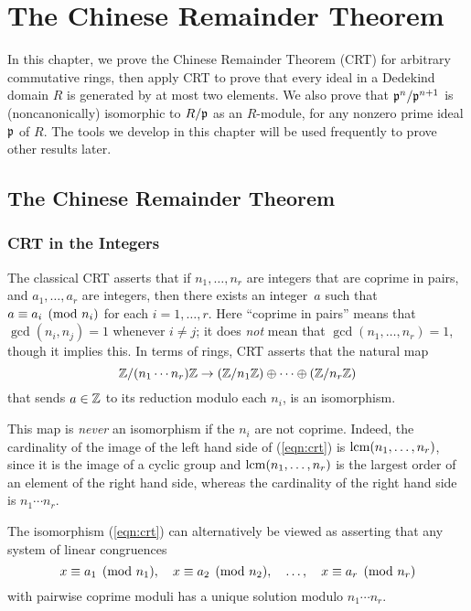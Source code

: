\chapter{The Chinese Remainder Theorem}\label{ch:crt}
In this chapter, we prove the Chinese Remainder Theorem (CRT) for
arbitrary commutative rings, then apply CRT to prove that every ideal
in a Dedekind domain $R$ is generated by at most two elements.  We
also prove that $\mathfrak{p}^n/\mathfrak{p}^{n+1}$ is (noncanonically) isomorphic to
$R/\mathfrak{p}$ as an $R$-module, for any nonzero prime ideal $\mathfrak{p}$ of $R$.  The
tools we develop in this chapter will be used frequently to prove
other results later.

\section{The Chinese Remainder Theorem}

\subsection{CRT in the Integers}
The classical CRT asserts that if $n_1,\ldots, n_r$ are integers that are coprime
in pairs, and $a_1,\ldots, a_r$ are integers, then there exists an
integer~$a$ such that $a\equiv a_i\pmod{n_i}$ for each $i=1,\ldots,r$.
Here ``coprime in pairs'' means that $\gcd(n_i,n_j)=1$ whenever
$i\neq j$; it does {\em not} mean that $\gcd(n_1,\ldots, n_r)=1$,
though it implies this. 
In terms of rings, CRT asserts that the
natural map
\begin{equation}\label{eqn:crt}
\mathbb{Z}/(n_1\cdots n_r)\mathbb{Z} \to (\mathbb{Z}/n_1\mathbb{Z})\oplus \cdots \oplus (\mathbb{Z}/n_r\mathbb{Z})
\end{equation}
that sends $a \in \mathbb{Z}$ to its reduction modulo each $n_i$,
is an isomorphism.  

This map is {\em never} an isomorphism if the $n_i$ are not coprime.
Indeed, the cardinality of the image of the left hand side of
(\ref{eqn:crt}) is $\operatorname{lcm}(n_1,\ldots, n_r)$, since it is the image of a
cyclic group and $\operatorname{lcm}(n_1,\ldots, n_r)$ is the largest order of an
element of the right hand side, whereas the cardinality of the right
hand side is $n_1\cdots n_r$.

The isomorphism (\ref{eqn:crt}) can alternatively be viewed as
asserting that any system of linear congruences
$$
  x \equiv a_1 \pmod{n_1}, \quad  
x \equiv a_2 \pmod{n_2}, \quad
\ldots, \quad
x \equiv a_r \pmod{n_r}
$$
with pairwise coprime moduli has a unique solution modulo $n_1\cdots n_r$.

